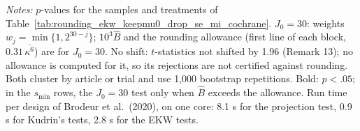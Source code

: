\begin{table}[htbp]
\medskip
\begin{minipage}{\linewidth}
\footnotesize
\textit{Notes:} $p$-values for the samples and treatments of Table~\ref{tab:rounding_ekw_keepmu0_drop_se_mi_cochrane}.
$J_0=30$: weights $w_j=\min\{1,2^{30-j}\}$; $10^3\widehat{B}$ and the rounding allowance (first line of each block, $0.31\,\overline{\kappa^6}$) are for $J_0=30$.
No shift: $t$-statistics not shifted by 1.96 (Remark 13); no allowance is computed for it, so its rejections are not certified against rounding.
Both cluster by article or trial and use 1,000 bootstrap repetitions.
Bold: $p<.05$; in the $s_{\min}$ rows, the $J_0=30$ test only when $\widehat{B}$ exceeds the allowance.
Run time per design of Brodeur et al.\ (2020), on one core: 8.1 s for the projection test, 0.9 s for Kudrin's tests, 2.8 s for the EKW tests.
\end{minipage}
\end{table}
